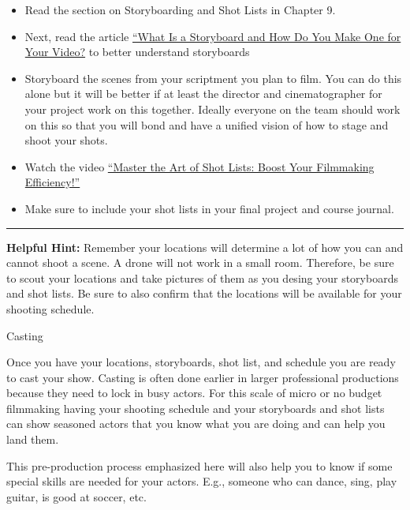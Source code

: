 \documentclass[
]{book}
\providecommand{\tightlist}{%
  \setlength{\itemsep}{0pt}\setlength{\parskip}{0pt}}
\begin{document}
\begin{reflect}
\begin{itemize}
\tightlist
\item
  Read the section on Storyboarding and Shot Lists in Chapter 9.
\item
  Next, read the article \href{https://www.wyzowl.com/what-is-a-storyboard/}{``What Is a Storyboard and How Do You Make One for Your Video?} to better understand storyboards
\item
  Storyboard the scenes from your scriptment you plan to film. You can do this alone but it will be better if at least the director and cinematographer for your project work on this together. Ideally everyone on the team should work on this so that you will bond and have a unified vision of how to stage and shoot your shots.
\item
  Watch the video \href{https://www.youtube.com/watch?v=-rzJP_5L_yQ}{``Master the Art of Shot Lists: Boost Your Filmmaking Efficiency!''}
\end{itemize}

\begin{itemize}
\tightlist
\item
  Make sure to include your shot lists in your final project and course journal.
\end{itemize}

\begin{center}\rule{0.5\linewidth}{0.5pt}\end{center}

\textbf{Helpful Hint:} Remember your locations will determine a lot of how you can and cannot shoot a scene. A drone will not work in a small room. Therefore, be sure to scout your locations and take pictures of them as you desing your storyboards and shot lists. Be sure to also confirm that the locations will be available for your shooting schedule.
\end{reflect}

{Casting}

Once you have your locations, storyboards, shot list, and schedule you are ready to cast your show. Casting is often done earlier in larger professional productions because they need to lock in busy actors. For this scale of micro or no budget filmmaking having your shooting schedule and your storyboards and shot lists can show seasoned actors that you know what you are doing and can help you land them.

This pre-production process emphasized here will also help you to know if some special skills are needed for your actors. E.g., someone who can dance, sing, play guitar, is good at soccer, etc.
\end{document}
